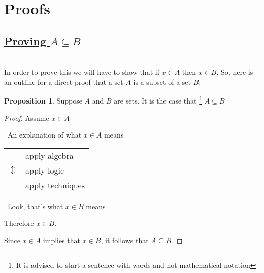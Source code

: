 \documentclass{amsart} %
\theoremstyle{definition} %
\theoremstyle{proposition} %
\newtheorem*{prpn}{Proposition}
\theoremstyle{remark} %
\begin{document}
\bigskip \bigskip \bigskip \bigskip \bigskip

\section{\textbf{Proofs}}

\subsection{\underline{Proving $A \subseteq B$}}

\hfill\\ %

In order to prove this we will have to show that if $x \in A$ then $x \in B$. So, here is an outline for a direct proof that a set $A$ is a subset of a set $B$:

\begin{prpn}
Suppose $A$ and $B$ are sets. It is the case that \footnote{It is advised to start a sentence with words and not mathematical notation} $A \subseteq B$
\end{prpn}

\begin{proof}
Assume $x \in A$

      \begin{center}
            \guillemotleft\ An explanation of what $ x \in A$ means \guillemotright
      \end{center}

      \begin{center}
      \begin{tabular}{r l}
            \multirow{3}{*}{\huge $\updownarrow$} & apply algebra \\ %
            & apply logic \\
            & apply techniques \\
      \end{tabular}
      \end{center}

      \begin{center}
            \guillemotleft\ Look, that's what $x \in B$ means \guillemotright
      \end{center}

      Therefore $x \in B$.

      Since $x \in A$ implies that $x \in B$, it follows that $A \subseteq B$.

\end{proof}
\end{document}
